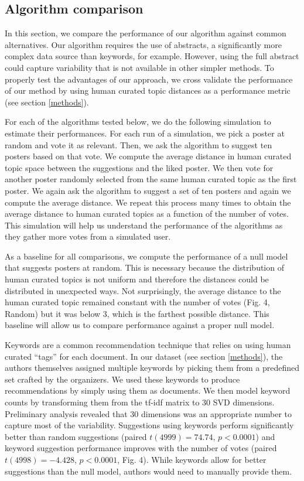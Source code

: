 \documentclass[a4paper]{article}
\begin{document}
\subsection{Algorithm comparison}

In this section, we compare the performance of our algorithm against common alternatives. Our algorithm requires the use of abstracts, a significantly more complex data source than keywords, for example. However, using the full abstract could capture variability that is not available in other simpler methods. To properly test the advantages of our approach, we cross validate the performance of our method by using human curated topic distances as a performance metric (see section  \ref{methods}).

For each of the algorithms tested below, we do the following simulation to estimate their performances. For each run of a simulation, we pick a poster at random and vote it as relevant. Then, we ask the algorithm to suggest ten posters based on that vote. We compute the average distance in human curated topic space between the suggestions and the liked poster. We then vote for another poster randomly selected from the same human curated topic as the first poster. We again ask the algorithm to suggest a set of ten posters and again we compute the average distance. We repeat this process many times to obtain the average distance to human curated topics as a function of the number of votes. This simulation will help us understand the performance of the algorithms as they gather more votes from a simulated user.

As a baseline for all comparisons, we compute the performance of a null model that suggests posters at random. This is necessary because the distribution of human curated topics is not uniform and therefore the distances could be distributed in unexpected ways. Not surprisingly, the average distance to the human curated topic remained constant with the number of votes (Fig. 4, Random) but it was below 3, which is the farthest possible distance. This baseline will allow us to compare performance against a proper null model.

Keywords are a common recommendation technique that relies on using human curated “tags” for each document. In our dataset (see section \ref{methods}), the authors themselves assigned multiple keywords by picking them from a predefined set crafted by the organizers. We used these keywords to produce  recommendations by simply using them as documents. We then model keyword counts by transforming them from the tf-idf matrix to 30 SVD dimensions. Preliminary analysis revealed that 30 dimensions was an appropriate number to capture most of the variability. Suggestions using keywords perform significantly better than random suggestions (paired $t(4999) = 74.74$, $p < 0.0001$) and keyword suggestion performance improves with the number of votes (paired $t(4998) = -4.428$, $p < 0.0001$, Fig. 4). While keywords allow for better suggestions than the null model, authors would need to manually provide them.
\end{document}
